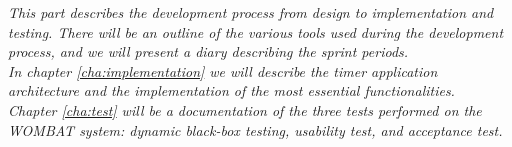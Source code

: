\textit{This part describes the development process from design to implementation and testing. 
There will be an outline of the various tools used during the development process, and we will present a diary describing the sprint periods.}\\

\textit{In chapter \ref{cha:implementation} we will describe the timer application architecture and the implementation of the most essential functionalities.}\\

\textit{Chapter \ref{cha:test} will be a documentation of the three tests performed on the WOMBAT system: dynamic black-box testing, usability test, and acceptance test.}